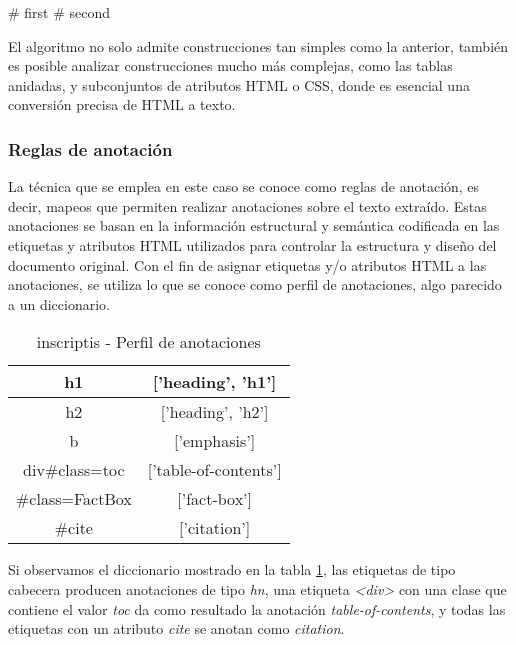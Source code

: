 \begin{Schunk}
  \begin{Soutput}
    # first
    # second
  \end{Soutput}
\end{Schunk}

El algoritmo no solo admite construcciones tan simples como la anterior, también es posible analizar
construcciones mucho más complejas, como las tablas anidadas, y subconjuntos de atributos HTML o CSS, donde
es esencial una conversión precisa de HTML a texto.

\subsubsection{Reglas de anotación}
\label{subsubsec:reglas de anotacion}

La técnica que se emplea en este caso se conoce como reglas de anotación, es decir, mapeos que permiten 
realizar anotaciones sobre el texto extraído. Estas anotaciones se basan en la información estructural y 
semántica codificada en las etiquetas y atributos HTML utilizados para controlar la estructura y diseño 
del documento original. Con el fin de asignar etiquetas y/o atributos HTML a las anotaciones, se utiliza 
lo que se conoce como perfil de anotaciones, algo parecido a un diccionario. 


\begin{table}[h]
  \begin{center}
  \begin{tabular}{| c | c |} \hline 
    h1 & ['heading', 'h1'] \\ \hline
    h2 & ['heading', 'h2'] \\ \hline
    b & ['emphasis'] \\ \hline
    div\#class=toc & ['table-of-contents'] \\ \hline
    \#class=FactBox & ['fact-box'] \\ \hline
    \#cite & ['citation'] \\ \hline
  \end{tabular}
  \caption{inscriptis - Perfil de anotaciones}
  \label{tab:inscriptis - perfil de anotaciones}
  \end{center}
\end{table}

Si observamos el diccionario mostrado en la tabla \ref{tab:inscriptis - perfil de anotaciones}, las 
etiquetas de tipo cabecera producen anotaciones de tipo \emph{hn}, una etiqueta \emph{<div>} con una 
clase que contiene el valor \emph{toc} da como resultado la anotación \emph{table-of-contents}, y todas 
las etiquetas con un atributo \emph{cite} se anotan como \emph{citation}.

